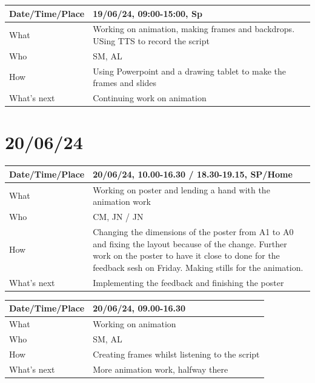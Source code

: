 \documentclass{article}
\begin{document}
\begin{table}[H]
\begin{tabular}{|p{1.5in}|p{4in}|}
\hline
Date/Time/Place & 19/06/24, 09:00-15:00, Sp \\ \hline
What            & Working on animation, making frames and backdrops. USing TTS to record the script \\ \hline
Who             & SM, AL \\ \hline
How             & Using Powerpoint and a drawing tablet to make the frames and slides \\ \hline
What's next     & Continuing work on animation \\ \hline
\end{tabular}
\end{table}

\section{20/06/24}

\begin{table}[H]
\begin{tabular}{|p{1.5in}|p{4in}|}
\hline
Date/Time/Place & 20/06/24, 10.00-16.30 / 18.30-19.15, SP/Home \\ \hline
What            & Working on poster and lending a hand with the animation work \\ \hline
Who             & CM, JN / JN \\ \hline
How             & Changing the dimensions of the poster from A1 to A0 and fixing the layout because of the change. Further work on the poster to have it close to done for the feedback sesh on Friday. Making stills for the animation. \\ \hline
What's next     & Implementing the feedback and finishing the poster \\ \hline
\end{tabular}
\end{table}

\begin{table}[H]
\begin{tabular}{|p{1.5in}|p{4in}|}
\hline
Date/Time/Place & 20/06/24, 09.00-16.30 \\ \hline
What            & Working on animation \\ \hline
Who             & SM, AL \\ \hline
How             & Creating frames whilst listening to the script \\ \hline
What's next     & More animation work, halfway there \\ \hline
\end{tabular}
\end{table}
\end{document}
